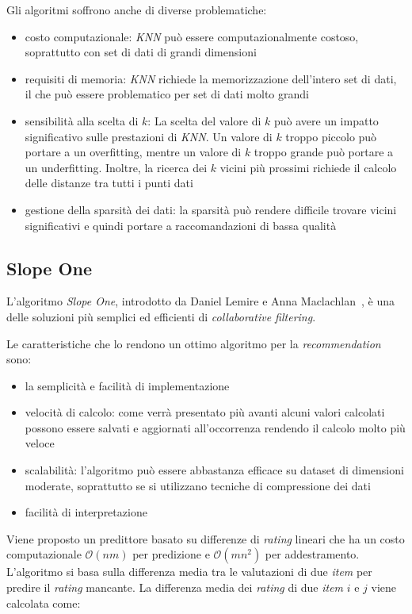 Gli algoritmi soffrono anche di diverse problematiche:
\begin{itemize}
    \item costo computazionale: \textit{KNN} può essere computazionalmente costoso, soprattutto con set di dati di grandi dimensioni
    \item requisiti di memoria: \textit{KNN} richiede la memorizzazione dell'intero set di dati, il che può essere problematico per set di dati molto grandi
    \item sensibilità alla scelta di $k$: La scelta del valore di $k$ può avere un impatto significativo sulle prestazioni di \textit{KNN}. Un valore di $k$ troppo piccolo può portare a un overfitting, mentre un valore di $k$ troppo grande può portare a un underfitting. Inoltre, la ricerca dei $k$ vicini più prossimi richiede il calcolo delle distanze tra tutti i punti dati
    \item gestione della sparsità dei dati: la sparsità può rendere difficile trovare vicini significativi e quindi portare a raccomandazioni di bassa qualità
\end{itemize}

\subsection{Slope One}\label{slopeone}

L'algoritmo \textit{Slope One}, introdotto da Daniel Lemire e Anna Maclachlan~\cite{SlopeOne}, è una delle soluzioni più semplici ed efficienti di \textit{collaborative filtering}.

Le caratteristiche che lo rendono un ottimo algoritmo per la \textit{recommendation} sono:
\begin{itemize}
    \item la semplicità e facilità di implementazione
    \item velocità di calcolo: come verrà presentato più avanti alcuni valori calcolati possono essere salvati e aggiornati all'occorrenza rendendo il calcolo molto più veloce
    \item scalabilità: l'algoritmo può essere abbastanza efficace su dataset di dimensioni moderate, soprattutto se si utilizzano tecniche di compressione dei dati
    \item facilità di interpretazione
\end{itemize}

Viene proposto un predittore basato su differenze di \textit{rating} lineari che ha un costo computazionale $\mathcal{O}(nm)$ per predizione e $\mathcal{O}(mn^2)$ per addestramento. L'algoritmo si basa sulla differenza media tra le valutazioni di due \textit{item} per predire il \textit{rating} mancante. La differenza media dei \textit{rating} di due \textit{item} $i$ e $j$ viene calcolata come:

